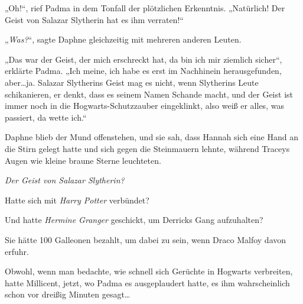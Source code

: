 „Oh!“, rief Padma in dem Tonfall der plötzlichen Erkenntnis. „Natürlich! Der Geist von Salazar Slytherin hat es ihm verraten!“

„\emph{Was?}“, sagte Daphne gleichzeitig mit mehreren anderen Leuten.

„Das war der Geist, der mich erschreckt hat, da bin ich mir ziemlich sicher“, erklärte Padma. „Ich meine, ich habe es erst im Nachhinein herausgefunden, aber…ja. Salazar Slytherins Geist mag es nicht, wenn Slytherins Leute schikanieren, er denkt, dass es seinem Namen Schande macht, und der Geist ist immer noch in die Hogwarts-Schutzzauber eingeklinkt, also weiß er alles, was passiert, da wette ich.“

Daphne blieb der Mund offenstehen, und sie sah, dass Hannah sich eine Hand an die Stirn gelegt hatte und sich gegen die Steinmauern lehnte, während Traceys Augen wie kleine braune Sterne leuchteten.

\emph{Der Geist von Salazar Slytherin?}

Hatte sich mit \emph{Harry Potter} verbündet?

Und hatte \emph{Hermine Granger} geschickt, um Derricks Gang aufzuhalten?

Sie hätte 100 Galleonen bezahlt, um dabei zu sein, wenn Draco Malfoy davon erfuhr.

Obwohl, wenn man bedachte, wie schnell sich Gerüchte in Hogwarts verbreiten, hatte Millicent, jetzt, wo Padma es ausgeplaudert hatte, es ihm wahrscheinlich schon vor dreißig Minuten gesagt…

